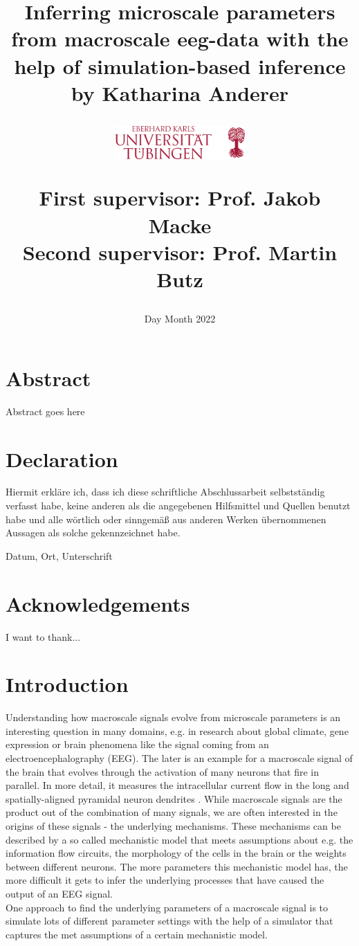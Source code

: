 \documentclass[12pt]{report}
\title{
Inferring microscale parameters from macroscale eeg-data with the help of simulation-based inference\\
\vspace{50px}
{\large by Katharina Anderer}
\vspace{60px}

\hspace{10px}\includegraphics[width=50mm,scale=0.5]{images/UniversitaetTuebingen.png}
\usepackage{stix}
\vspace{60px}
{\large First supervisor: Prof. Jakob Macke}\\
{\large Second supervisor: Prof. Martin Butz}
}
\date{Day Month 2022}
\begin{document}
\maketitle


\chapter*{Abstract}
Abstract goes here


\chapter*{Declaration}
Hiermit erkläre ich, dass ich diese schriftliche Abschlussarbeit selbstständig verfasst habe, keine anderen als die angegebenen Hilfsmittel und Quellen benutzt habe und alle wörtlich oder sinngemäß aus anderen Werken übernommenen Aussagen als solche gekennzeichnet habe.


Datum, Ort, Unterschrift

\chapter*{Acknowledgements}
I want to thank...

\tableofcontents

\chapter*{Introduction}

Understanding how macroscale signals evolve from microscale parameters
is an interesting question in many domains, e.g.
in research about global
climate, gene expression or brain phenomena like the signal coming from an
electroencephalography (EEG).
The later is an example for a macroscale signal of
the brain that evolves through the activation of many neurons that fire in
parallel. In more detail, it measures the intracellular current flow in the long and
spatially-aligned pyramidal neuron dendrites \citet{neymotin2020human}.
While macroscale signals are the product out of the combination of many signals, we are often interested in the origins of these signals - the underlying mechanisms. 
These mechanisms can be described by a so called mechanistic model that meets assumptions about e.g. the information flow circuits, the morphology of the cells in the brain or the weights between different neurons. The more parameters this mechanistic model has, the more difficult it gets to infer the underlying processes that have caused the output of an EEG signal. \\
One approach to find the underlying parameters of a macroscale signal is to simulate lots of different parameter settings with the help of a simulator that captures the met assumptions of a certain mechanistic model. 
\end{document}
